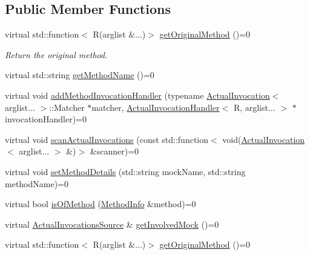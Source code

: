 \subsection*{Public Member Functions}
\begin{DoxyCompactItemize}
\item 
virtual std\+::function$<$ R(arglist \&...)$>$ \mbox{\hyperlink{structfakeit_1_1MethodMockingContext_1_1Context_a1878bb27937f4984d5c43e20c2b0b626}{get\+Original\+Method}} ()=0
\begin{DoxyCompactList}\small\item\em Return the original method. \end{DoxyCompactList}\item 
virtual std\+::string \mbox{\hyperlink{structfakeit_1_1MethodMockingContext_1_1Context_ab5f7cc2c8d00214baacaad4c49ccf17f}{get\+Method\+Name}} ()=0
\item 
virtual void \mbox{\hyperlink{structfakeit_1_1MethodMockingContext_1_1Context_a87b3a2d95daf8aaa2ae56b49e032c275}{add\+Method\+Invocation\+Handler}} (typename \mbox{\hyperlink{structfakeit_1_1ActualInvocation}{Actual\+Invocation}}$<$ arglist... $>$\+::Matcher $\ast$matcher, \mbox{\hyperlink{structfakeit_1_1ActualInvocationHandler}{Actual\+Invocation\+Handler}}$<$ R, arglist... $>$ $\ast$invocation\+Handler)=0
\item 
virtual void \mbox{\hyperlink{structfakeit_1_1MethodMockingContext_1_1Context_a89b30ea54bcf5e55c19696f77ad8423b}{scan\+Actual\+Invocations}} (const std\+::function$<$ void(\mbox{\hyperlink{structfakeit_1_1ActualInvocation}{Actual\+Invocation}}$<$ arglist... $>$ \&)$>$ \&scanner)=0
\item 
virtual void \mbox{\hyperlink{structfakeit_1_1MethodMockingContext_1_1Context_a9eb0cf6ed84ea4bd63333503bd6bdc1a}{set\+Method\+Details}} (std\+::string mock\+Name, std\+::string method\+Name)=0
\item 
virtual bool \mbox{\hyperlink{structfakeit_1_1MethodMockingContext_1_1Context_a126835068d4a7bcbf01f47080e690510}{is\+Of\+Method}} (\mbox{\hyperlink{structfakeit_1_1MethodInfo}{Method\+Info}} \&method)=0
\item 
virtual \mbox{\hyperlink{structfakeit_1_1ActualInvocationsSource}{Actual\+Invocations\+Source}} \& \mbox{\hyperlink{structfakeit_1_1MethodMockingContext_1_1Context_aab7f9487475b01f85e81b76cdf6c4860}{get\+Involved\+Mock}} ()=0
\item 
virtual std\+::function$<$ R(arglist \&...)$>$ \mbox{\hyperlink{structfakeit_1_1MethodMockingContext_1_1Context_a1878bb27937f4984d5c43e20c2b0b626}{get\+Original\+Method}} ()=0

\end{DoxyCompactItemize}
